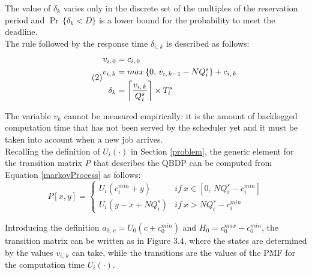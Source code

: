 The value of \( \delta_{k} \) varies only in the discrete set of the multiples of the reservation period and \( \Pr\,\{\delta_{k} < D\} \) is a lower bound for the probability to meet the deadline.\\
The rule followed by the response time \( \delta_{i,\,k} \) is described as follows:
\begin{equation} \tag{2} \label{markovProcess}
\begin{split}
  v_{i,\,0} &= c_{i,\,0}\\
  v_{i,\,k} &= max\,\{0,\,v_{i,\,k-1} - NQ_{i}^{s}\} + c_{i,\,k}\\
  \delta_{k} &= \ceil[\bigg]{\frac{v_{i,\,k}}{Q_{i}^{s}}} \times T_{i}^{s}
\end{split}
\end{equation}

The variable \( v_{k} \) cannot be measured empirically: it is the amount of backlogged computation time that has not been served by the scheduler yet and it must be taken into account when a new job arrives.\\
Recalling the definition of \( U_{i}(\cdot) \) in Section \ref{problem}, the generic element for the transition matrix \emph{P} that describes the QBDP can be computed from Equation \ref{markovProcess} as follows:
\begin{equation*}
  P[x,y] = 
  \begin{cases}
    U_{i}(c_{i}^{min}+y) & {if\ } x \in [0,\,NQ_{i}^{s}-c_{i}^{min}] \\
    U_{i}(y-x+NQ_{i}^{s}) & {if\ } x > NQ_{i}^{s}-c_{i}^{min}
  \end{cases}
\end{equation*}

Introducing the definition \( a_{0,\,c} = U_{0}(c+c_{0}^{min}) \) and \( H_{0} = c_{0}^{max} - c_{0}^{min} \), the transition matrix can be written as in Figure 3.4, where the states are determined by the values \( v_{i,\,k} \) can take, while the transitions are the values of the PMF for the computation time \( U_{i}(\cdot) \).

